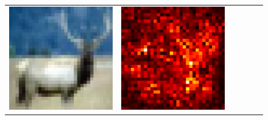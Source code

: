 \documentclass[preprint,12pt]{elsarticle}
\begin{document}
\begin{figure}[p]
\begin{tabular}{cccccc}
  \includegraphics[scale=\scale]{../visualizations/examples/cifar10/resnet18/images/4.png} &
  \includegraphics[scale=\scale]{../visualizations/examples/cifar10/resnet18/saliency_map/4.png} & 

\end{tabular}
\end{figure}
\end{document}
